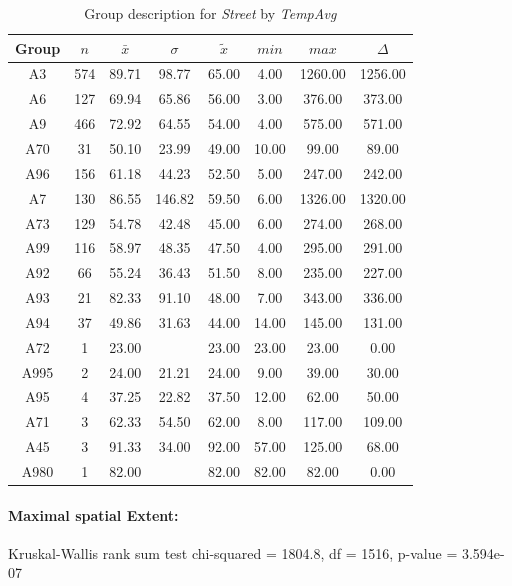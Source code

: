 \begin{table}[ht]
	\tiny
	\centering
	\begin{tabular}{c|c|c|c|c|c|c|c}
		\toprule
		Group & $n$ & $\bar{x}$ & $\sigma$ & $\tilde{x}$ & $min$ & $max$ & $\Delta$ \\  
		\midrule
		A3 & 574 & 89.71 & 98.77 & 65.00 & 4.00 & 1260.00 & 1256.00 \\ 
		A6 & 127 & 69.94 & 65.86 & 56.00 & 3.00 & 376.00 & 373.00 \\ 
		A9 & 466 & 72.92 & 64.55 & 54.00 & 4.00 & 575.00 & 571.00 \\ 
		A70 & 31 & 50.10 & 23.99 & 49.00 & 10.00 & 99.00 & 89.00 \\ 
		A96 & 156 & 61.18 & 44.23 & 52.50 & 5.00 & 247.00 & 242.00 \\ 
		A7 & 130 & 86.55 & 146.82 & 59.50 & 6.00 & 1326.00 & 1320.00 \\ 
		A73 & 129 & 54.78 & 42.48 & 45.00 & 6.00 & 274.00 & 268.00 \\ 
		A99 & 116 & 58.97 & 48.35 & 47.50 & 4.00 & 295.00 & 291.00 \\ 
		A92 & 66 & 55.24 & 36.43 & 51.50 & 8.00 & 235.00 & 227.00 \\ 
		A93 & 21 & 82.33 & 91.10 & 48.00 & 7.00 & 343.00 & 336.00 \\ 
		A94 & 37 & 49.86 & 31.63 & 44.00 & 14.00 & 145.00 & 131.00 \\ 
		A72 & 1 & 23.00 &  & 23.00 & 23.00 & 23.00 & 0.00 \\ 
		A995 & 2 & 24.00 & 21.21 & 24.00 & 9.00 & 39.00 & 30.00 \\ 
		A95 & 4 & 37.25 & 22.82 & 37.50 & 12.00 & 62.00 & 50.00 \\ 
		A71 & 3 & 62.33 & 54.50 & 62.00 & 8.00 & 117.00 & 109.00 \\ 
		A45 & 3 & 91.33 & 34.00 & 92.00 & 57.00 & 125.00 & 68.00 \\ 
		A980 & 1 & 82.00 &  & 82.00 & 82.00 & 82.00 & 0.00 \\ 
		  \bottomrule
	\end{tabular}
	\caption{Group description for \textit{Street} by \textit{TempAvg}}
\end{table}

\paragraph{Maximal spatial Extent:}
Kruskal-Wallis rank sum test chi-squared = 1804.8, df = 1516, p-value = 3.594e-07

